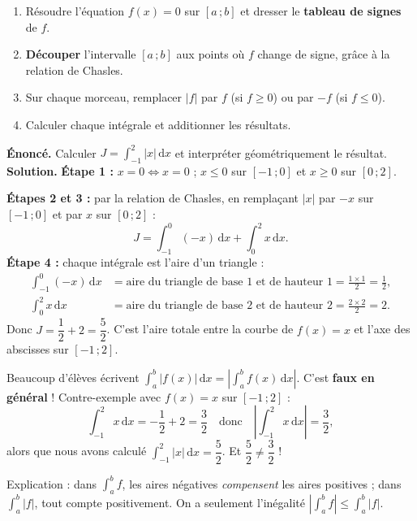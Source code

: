 \documentclass[11pt]{article}
\begin{document}
\begin{methode}
\begin{enumerate}
\item Résoudre l'équation $f(x) = 0$ sur $[a\,;b]$ et dresser le \textbf{tableau de signes} de $f$.
\item \textbf{Découper} l'intervalle $[a\,;b]$ aux points où $f$ change de signe, grâce à la relation de Chasles.
\item Sur chaque morceau, remplacer $|f|$ par $f$ (si $f \geq 0$) ou par $-f$ (si $f \leq 0$).
\item Calculer chaque intégrale et additionner les résultats.
\end{enumerate}
\end{methode}

\begin{exoresolu}
\textbf{Énoncé.} Calculer $J = \int_{-1}^{2} |x|\,\mathrm{d}x$ et interpréter géométriquement le résultat.
\tcblower
\textbf{Solution.} \textbf{Étape 1 :} $x = 0 \iff x = 0$ ; $x \leq 0$ sur $[-1\,;0]$ et $x \geq 0$ sur $[0\,;2]$.

\textbf{Étapes 2 et 3 :} par la relation de Chasles, en remplaçant $|x|$ par $-x$ sur $[-1\,;0]$ et par $x$ sur $[0\,;2]$ :
\[ J = \int_{-1}^{0} (-x)\,\mathrm{d}x + \int_{0}^{2} x\,\mathrm{d}x. \]
\textbf{Étape 4 :} chaque intégrale est l'aire d'un triangle :
\begin{align*}
\int_{-1}^{0} (-x)\,\mathrm{d}x &= \text{aire du triangle de base } 1 \text{ et de hauteur } 1 = \frac{1 \times 1}{2} = \frac{1}{2}, \\
\int_{0}^{2} x\,\mathrm{d}x &= \text{aire du triangle de base } 2 \text{ et de hauteur } 2 = \frac{2 \times 2}{2} = 2.
\end{align*}
Donc $J = \dfrac{1}{2} + 2 = \dfrac{5}{2}$. C'est l'aire totale entre la courbe de $f(x) = x$ et l'axe des abscisses sur $[-1\,;2]$.
\end{exoresolu}

\begin{attention}
Beaucoup d'élèves écrivent $\int_a^b |f(x)|\,\mathrm{d}x = \left|\int_a^b f(x)\,\mathrm{d}x\right|$. C'est \textbf{faux en général} ! Contre-exemple avec $f(x) = x$ sur $[-1\,;2]$ :
\[ \int_{-1}^{2} x\,\mathrm{d}x = -\frac{1}{2} + 2 = \frac{3}{2} \quad \text{donc} \quad \left|\int_{-1}^{2} x\,\mathrm{d}x\right| = \frac{3}{2}, \]
alors que nous avons calculé $\int_{-1}^{2} |x|\,\mathrm{d}x = \dfrac{5}{2}$. Et $\dfrac{5}{2} \neq \dfrac{3}{2}$ !

Explication : dans $\int_a^b f$, les aires négatives \emph{compensent} les aires positives ; dans $\int_a^b |f|$, tout compte positivement. On a seulement l'inégalité $\left|\int_a^b f\right| \leq \int_a^b |f|$.
\end{attention}
\end{document}

